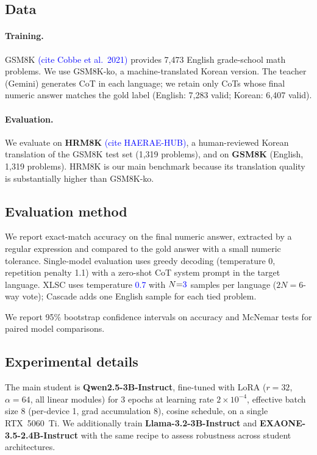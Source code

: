 \documentclass{article}
\newcommand{\note}[1]{\textcolor{blue}{{#1}}}
\begin{document}
\subsection{Data}
\paragraph{Training.} GSM8K \note{(cite Cobbe et al.\ 2021)} provides
7{,}473 English grade-school math problems. We use GSM8K-ko, a
machine-translated Korean version. The teacher (Gemini) generates CoT
in each language; we retain only CoTs whose final numeric answer
matches the gold label (English: 7{,}283 valid; Korean: 6{,}407 valid).

\paragraph{Evaluation.} We evaluate on \textbf{HRM8K}
\note{(cite HAERAE-HUB)}, a human-reviewed Korean translation of the
GSM8K test set (1{,}319 problems), and on \textbf{GSM8K} (English,
1{,}319 problems). HRM8K is our main benchmark because its translation
quality is substantially higher than GSM8K-ko.

\subsection{Evaluation method}
We report exact-match accuracy on the final numeric answer, extracted
by a regular expression and compared to the gold answer with a small
numeric tolerance. Single-model evaluation uses greedy decoding
(temperature 0, repetition penalty 1.1) with a zero-shot CoT system
prompt in the target language. XLSC uses temperature \note{0.7} with
$N{=}\note{3}$ samples per language ($2N{=}6$-way vote); Cascade adds
one English sample for each tied problem.

We report 95\% bootstrap confidence intervals on accuracy and McNemar
tests for paired model comparisons.

\subsection{Experimental details}
The main student is \textbf{Qwen2.5-3B-Instruct}, fine-tuned with LoRA
($r{=}32$, $\alpha{=}64$, all linear modules) for 3 epochs at learning
rate $2\times 10^{-4}$, effective batch size 8 (per-device 1, grad
accumulation 8), cosine schedule, on a single RTX~5060~Ti. We
additionally train \textbf{Llama-3.2-3B-Instruct} and
\textbf{EXAONE-3.5-2.4B-Instruct} with the same recipe to assess
robustness across student architectures.
\end{document}
